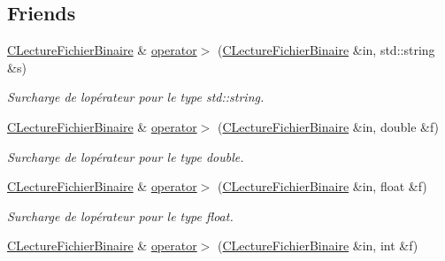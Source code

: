\subsection*{Friends}
\begin{DoxyCompactItemize}
\item 
\hypertarget{class_c_lecture_fichier_binaire_abc9f4d65dcf682dbf572f5110a00252d}{}\hyperlink{class_c_lecture_fichier_binaire}{C\+Lecture\+Fichier\+Binaire} \& \hyperlink{class_c_lecture_fichier_binaire_abc9f4d65dcf682dbf572f5110a00252d}{operator$>$} (\hyperlink{class_c_lecture_fichier_binaire}{C\+Lecture\+Fichier\+Binaire} \&in, std\+::string \&s)\label{class_c_lecture_fichier_binaire_abc9f4d65dcf682dbf572f5110a00252d}

\begin{DoxyCompactList}\small\item\em Surcharge de l\textquotesingle{}opérateur pour le type {\itshape std\+::string}. \end{DoxyCompactList}\item 
\hypertarget{class_c_lecture_fichier_binaire_a8b4123b210cccf9da0d2eb60dc19b8a0}{}\hyperlink{class_c_lecture_fichier_binaire}{C\+Lecture\+Fichier\+Binaire} \& \hyperlink{class_c_lecture_fichier_binaire_a8b4123b210cccf9da0d2eb60dc19b8a0}{operator$>$} (\hyperlink{class_c_lecture_fichier_binaire}{C\+Lecture\+Fichier\+Binaire} \&in, double \&f)\label{class_c_lecture_fichier_binaire_a8b4123b210cccf9da0d2eb60dc19b8a0}

\begin{DoxyCompactList}\small\item\em Surcharge de l\textquotesingle{}opérateur pour le type {\itshape double}. \end{DoxyCompactList}\item 
\hypertarget{class_c_lecture_fichier_binaire_a8727572665715de99f2908c711e45114}{}\hyperlink{class_c_lecture_fichier_binaire}{C\+Lecture\+Fichier\+Binaire} \& \hyperlink{class_c_lecture_fichier_binaire_a8727572665715de99f2908c711e45114}{operator$>$} (\hyperlink{class_c_lecture_fichier_binaire}{C\+Lecture\+Fichier\+Binaire} \&in, float \&f)\label{class_c_lecture_fichier_binaire_a8727572665715de99f2908c711e45114}

\begin{DoxyCompactList}\small\item\em Surcharge de l\textquotesingle{}opérateur pour le type {\itshape float}. \end{DoxyCompactList}\item 
\hypertarget{class_c_lecture_fichier_binaire_a327898e8bcb11d00bdb07e3e8bd361bd}{}\hyperlink{class_c_lecture_fichier_binaire}{C\+Lecture\+Fichier\+Binaire} \& \hyperlink{class_c_lecture_fichier_binaire_a327898e8bcb11d00bdb07e3e8bd361bd}{operator$>$} (\hyperlink{class_c_lecture_fichier_binaire}{C\+Lecture\+Fichier\+Binaire} \&in, int \&f)\label{class_c_lecture_fichier_binaire_a327898e8bcb11d00bdb07e3e8bd361bd}


\end{DoxyCompactItemize}

